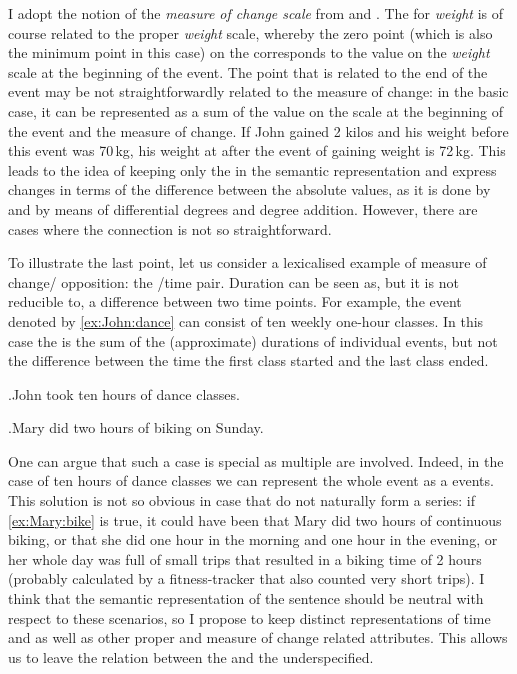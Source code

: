 I adopt the notion of the \textit{measure of change scale} from \citet{KennedyLevin:08} and \citet{Kennedy:12}. The  for \textit{weight} is of course related to the proper \textit{weight} scale, whereby the zero point (which is also the minimum point in this case) on the  corresponds to the value on the \textit{weight} scale at the beginning of the event. The point that is related to the end of the event may be not straightforwardly related to the measure of change: in the basic case, it can be represented as a sum of the value on the scale at the beginning of the event and the measure of change. If John gained 2 kilos and his weight before this event was 70\,kg, his weight at after the event of gaining weight is 72\,kg. This leads to the idea of keeping only the  in the semantic representation and express changes in terms of the difference between the absolute values, as it is done by \citet{Kennedy:01} and \citet{KennedyLevin:02} by means of differential degrees and degree addition. However, there are cases where the connection is not so straightforward.

To illustrate the last point, let us consider a lexicalised example of measure of change/ opposition: the /time pair. Duration can be seen as, but it is not reducible to, a difference between two time points. For example, the event denoted by \ref{ex:John:dance} can consist of ten weekly one-hour classes. In this case the  is the sum of the (approximate) durations of individual events, but not the difference between the time the first class started and the last class ended. 

\ex.\label{ex:John:dance}John took ten hours of dance classes.

\ex.\label{ex:Mary:bike}Mary did two hours of biking on Sunday. 

One can argue that such a case is special as multiple  are involved. Indeed, in the case of ten hours of dance classes we can represent the whole event as a  events. This solution is not so obvious in case  that do not naturally form a series: if \ref{ex:Mary:bike} is true, it could have been that Mary did two hours of continuous biking, or that she did one hour in the morning and one hour in the evening, or her whole day was full of small trips that resulted in a  biking time of 2 hours (probably calculated by a fitness-tracker that also counted very short trips). I think that the semantic representation of the sentence should be neutral with respect to these scenarios, so I propose to keep distinct representations of time and  as well as other proper and measure of change related attributes. This allows us to leave the relation between the  and the  underspecified.

